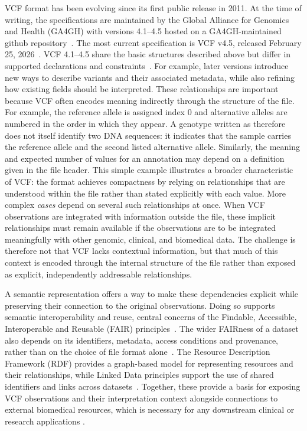 VCF format has been evolving since its first public release in 2011.
At the time of writing, the specifications are maintained by the Global Alliance for Genomics and Health (GA4GH) \cite{ga4gh2016federated} with versions 4.1--4.5 hosted on a GA4GH-maintained github repository~\cite{ga4gh_hts_specs}.
The most current specification is VCF v4.5, released February 25, 2026~\cite{vcf45}.
VCF 4.1--4.5 share the basic structures described above but differ in supported declarations and constraints~\cite{htsspecs,vcf45}. 
For example, later versions introduce new ways to describe variants and their associated metadata, while also refining how existing fields should be interpreted. 
These relationships are important because VCF often encodes meaning indirectly through the structure of the file.
For example, the reference allele is assigned index 0 and alternative alleles are numbered in the order in which they appear.
A genotype written as  therefore does not itself identify two DNA sequences: it indicates that the sample carries the reference allele and the second listed alternative allele.
Similarly, the meaning and expected number of values for an annotation may depend on a definition given in the file header.
This simple example illustrates a broader characteristic of VCF: the format achieves compactness by relying on relationships that are understood within the file rather than stated explicitly with each value. 
More complex \emph{cases} depend on several such relationships at once. 
When VCF observations are integrated with information outside the file, these implicit relationships must remain available if the observations are to be integrated meaningfully with other genomic, clinical, and biomedical data.
The challenge is therefore not that VCF lacks contextual information, but that much of this context is encoded through the internal structure of the file rather than exposed as explicit, independently addressable relationships.

A semantic representation offers a way to make these dependencies explicit while preserving their connection to the original observations.
Doing so supports semantic interoperability and reuse, central concerns of the Findable, Accessible, Interoperable and Reusable (FAIR) principles~\cite{wilkinson2016fair}.
The wider FAIRness of a dataset also depends on its identifiers, metadata, access conditions and provenance, rather than on the choice of file format alone~\cite{bahim2020fair}.
The Resource Description Framework (RDF) provides a graph-based model for representing resources and their relationships, while Linked Data principles support the use of shared identifiers and links across datasets~\cite{decker2000semantic,bizer2009linked}.
Together, these provide a basis for exposing VCF observations and their interpretation context alongside connections to external biomedical resources, which is necessary for any downstream clinical or research applications \cite{lubin2017variantfile}.

